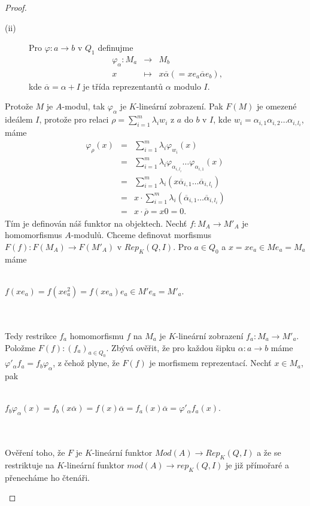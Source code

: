 \begin{proof}
\begin{description}
\begin{description}
              \item[(ii)] Pro $\varphi:a\to b$ v $Q_1$ definujme 
                \begin{eqnarray}
                  \varphi_\alpha: M_a &\to& M_b \nonumber \\
                  x &\mapsto& x\overline \alpha(=xe_a\overline\alpha e_b), \nonumber
                \end{eqnarray}
              kde $\overline\alpha=\alpha+I$ je třída reprezentantů $\alpha$ 
              modulo $I$.
            \end{description}
            Protože $M$ je $A$-modul, tak $\varphi_\alpha$ je $K$-lineární 
            zobrazení. Pak $F(M)$ je omezené ideálem $I$, protože pro relaci 
            $\rho=\sum_{i=1}^m \lambda_iw_i$ z $a$ do $b$ v $I$, kde 
            $w_i=\alpha_{i,1}\alpha_{i,2}\ldots\alpha_{i,l_i}$, máme 
            \begin{eqnarray}
              \varphi_\rho(x) &=& \sum_{i=1}^m \lambda_i \varphi_{w_i}(x) \nonumber \\
              &=& \sum_{i=1}^m \lambda_i \varphi_{\alpha_{i,l_i}}\ldots \varphi_{\alpha_{i,1}}(x)  \nonumber \\
              &=& \sum_{i=1}^m \lambda_i(x \overline \alpha_{i,1} \ldots \overline \alpha_{i,l_i}) \nonumber \\
              &=&  x\cdot \sum_{i=1}^m \lambda_i(\overline \alpha_{i,1} \ldots \overline \alpha_{i,l_i}) \nonumber \\
              &=& x\cdot \overline \rho = x0 = 0. \nonumber
            \end{eqnarray}
            Tím je definován náš funktor na objektech. Nechť $f:M_A\to M'_A$ je 
            homomorfismus $A$-modulů. Chceme definovat morfismus $F(f):F(M_A)\to 
            F(M'_A)$ v $Rep_K(Q,I)$. Pro $a\in Q_0$ a $x=xe_a\in Me_a=M_a$ máme 
            \\\\\centerline{$f(xe_a)=f(xe_a^2)=f(xe_a)e_a\in M'e_a=M'_a$.}\\\\
            Tedy restrikce $f_a$ homomorfismu $f$ na $M_a$ je $K$-lineární zobrazení $f_a:M_a\to 
            M'_a$.  Položme $F(f):(f_a)_{a\in Q_0}$. Zbývá ověřit, že pro každou šipku $\alpha:a\to b$ 
            máme $\varphi'_\alpha f_a=f_b\varphi_\alpha$, z čehož plyne, že $F(f)$ 
            je morfismem reprezentací. Nechť $x\in M_a$, pak
            \\\\\centerline{$f_b\varphi_\alpha(x)=f_b(x\overline \alpha)=f(x)\overline\alpha=f_a(x)\overline\alpha=\varphi'_\alpha f_a(x)$.}\\\\
            Ověření toho, že $F$ je $K$-lineární funktor $Mod(A)\to Rep_K(Q,I)$ a
            že se restriktuje na $K$-lineární funktor $mod(A)\to rep_K(Q,I)$ je již
             přímořaré a přenecháme ho 
            čtenáři.
            

\end{description}
\end{proof}
